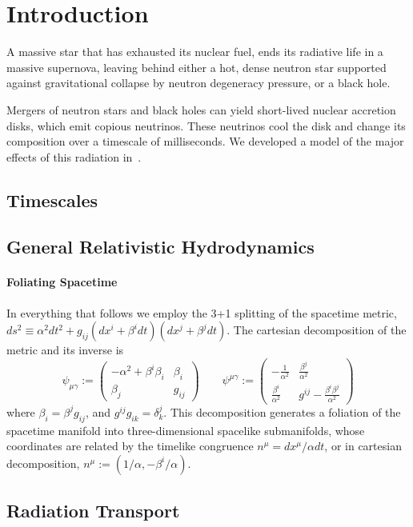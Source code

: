 \chapter{Introduction}
\label{chap:intro}

A massive star that has exhausted its nuclear fuel, ends its radiative life
in a massive supernova, leaving behind either a hot, dense neutron star supported
against gravitational collapse by neutron degeneracy pressure, or a black hole.

Mergers of neutron stars and black holes can yield short-lived nuclear accretion
disks, which emit copious neutrinos. These neutrinos cool the disk and change
its composition over a timescale of milliseconds. We developed a model of the
major effects of this radiation in~\cite{deat2013-leakage}.



\section{Timescales}

\section{General Relativistic Hydrodynamics}

\subsubsection{Foliating Spacetime}
\label{ssec:adm_metric}
In everything that follows we employ the 3+1 splitting of the spacetime metric,
$ds^2 \equiv \alpha^2dt^2 + g_{ij}(dx^i+\beta^idt)(dx^j+\beta^jdt)$.
The cartesian decomposition of the metric and its inverse is
\begin{equation}
  \psi_{\mu\gamma} :=
  \left(
  \begin{matrix}
    -\alpha^2 + \beta^i \beta_i  & \beta_i \\
    \beta_j                      & g_{ij}
  \end{matrix}
  \right)
  \qquad
  \psi^{\mu\gamma} :=
  \left(
  \begin{matrix}
    -\frac{1}{\alpha^2}          & \frac{\beta^j}{\alpha^2} \\
    \frac{\beta^i}{\alpha^2}     & g^{ij} - \frac{\beta^i \beta^j}{\alpha^2}
  \end{matrix}
  \right)
\end{equation}
where $\beta_i=\beta^j g_{ij}$, and $g^{ij}g_{ik}=\delta^{j}_{k}$.
This decomposition generates a foliation of the spacetime manifold into
three-dimensional spacelike submanifolds, whose coordinates are related
by the timelike congruence $n^\mu=dx^\mu/\alpha dt$, or in cartesian
decomposition, $n^\mu:=(1/\alpha,-\beta^i/\alpha)$.

\section{Radiation Transport}
